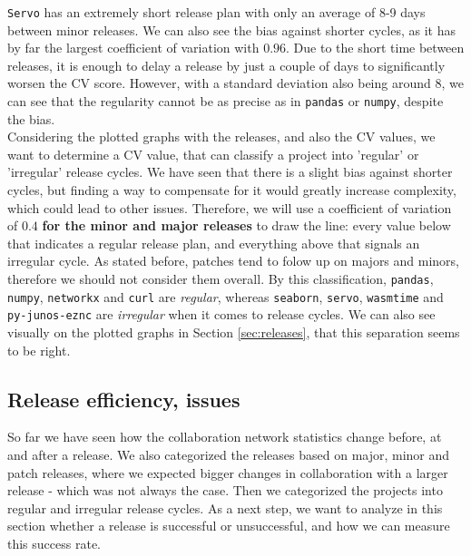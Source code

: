 \texttt{Servo} has an extremely short release plan with only an average of 8-9 days between minor releases. We can also see the bias against shorter cycles, as it has by far the largest coefficient of variation with $0.96$. Due to the short time between releases, it is enough to delay a release by just a couple of days to significantly worsen the CV score. However, with a standard deviation also being around 8, we can see that the regularity cannot be as precise as in \texttt{pandas} or \texttt{numpy}, despite the bias. \\

Considering the plotted graphs with the releases, and also the CV values, we want to determine a CV value, that can classify a project into 'regular' or 'irregular' release cycles. We have seen that there is a slight bias against shorter cycles, but finding a way to compensate for it would greatly increase complexity, which could lead to other issues. Therefore, we will use a coefficient of variation of $0.4$ \textbf{for the minor and major releases} to draw the line: every value below that indicates a regular release plan, and everything above that signals an irregular cycle. As stated before, patches tend to folow up on majors and minors, therefore we should not consider them overall.  By this classification, \texttt{pandas}, \texttt{numpy}, \texttt{networkx} and \texttt{curl} are \textit{regular}, whereas \texttt{seaborn}, \texttt{servo}, \texttt{wasmtime} and \texttt{py-junos-eznc} are \textit{irregular} when it comes to release cycles. We can also see visually on the plotted graphs in Section \ref{sec:releases}, that this separation seems to be right.

\subsection{Release efficiency, issues}

So far we have seen how the collaboration network statistics change before, at and after a release. We also categorized the releases based on major, minor and patch releases, where we expected bigger changes in collaboration with a larger release - which was not always the case. Then we categorized the projects into regular and irregular release cycles. As a next step, we want to analyze in this section whether a release is successful or unsuccessful, and how we can measure this success rate.

